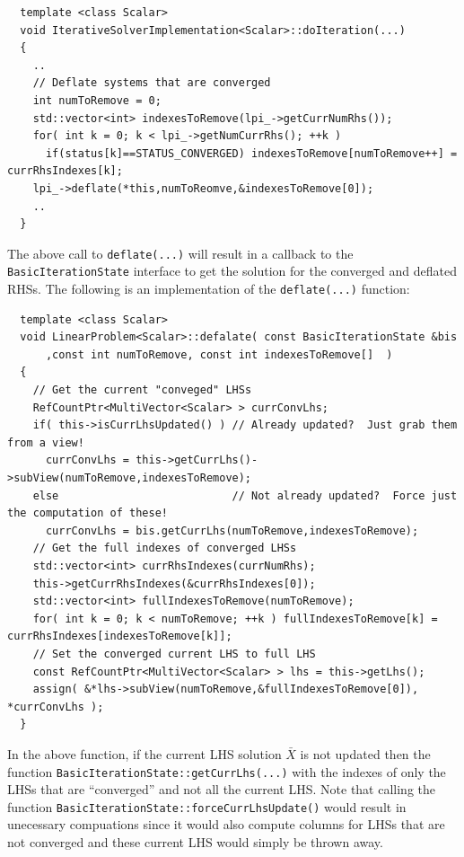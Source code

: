 \documentclass[pdf,ps2pdf,11pt]{SANDreport}
\begin{document}
\begin{enumerate}
{\scriptsize\begin{verbatim}
  template <class Scalar>
  void IterativeSolverImplementation<Scalar>::doIteration(...)
  {
    ..
    // Deflate systems that are converged
    int numToRemove = 0;
    std::vector<int> indexesToRemove(lpi_->getCurrNumRhs());
    for( int k = 0; k < lpi_->getNumCurrRhs(); ++k )
      if(status[k]==STATUS_CONVERGED) indexesToRemove[numToRemove++] = currRhsIndexes[k];
    lpi_->deflate(*this,numToReomve,&indexesToRemove[0]);
    ..
  }
\end{verbatim}}

The above call to {}\texttt{deflate(...)} will result in a callback to
the {}\texttt{Basic\-Iteration\-State} interface to get the solution
for the converged and deflated RHSs.  The following is an
implementation of the {}\texttt{deflate(...)} function:

{\scriptsize\begin{verbatim}
  template <class Scalar>
  void LinearProblem<Scalar>::defalate( const BasicIterationState &bis
      ,const int numToRemove, const int indexesToRemove[]  )
  {
    // Get the current "conveged" LHSs
    RefCountPtr<MultiVector<Scalar> > currConvLhs;
    if( this->isCurrLhsUpdated() ) // Already updated?  Just grab them from a view!
      currConvLhs = this->getCurrLhs()->subView(numToRemove,indexesToRemove);
    else                           // Not already updated?  Force just the computation of these!  
      currConvLhs = bis.getCurrLhs(numToRemove,indexesToRemove);
    // Get the full indexes of converged LHSs
    std::vector<int> currRhsIndexes(currNumRhs);
    this->getCurrRhsIndexes(&currRhsIndexes[0]);
    std::vector<int> fullIndexesToRemove(numToRemove);
    for( int k = 0; k < numToRemove; ++k ) fullIndexesToRemove[k] = currRhsIndexes[indexesToRemove[k]];
    // Set the converged current LHS to full LHS
    const RefCountPtr<MultiVector<Scalar> > lhs = this->getLhs();
    assign( &*lhs->subView(numToRemove,&fullIndexesToRemove[0]), *currConvLhs );
  }
\end{verbatim}}

In the above function, if the current LHS solution $\bar{X}$ is not
updated then the function
{}\texttt{Basic\-Iteration\-State\-::get\-Curr\-Lhs(...)} with the
indexes of only the LHSs that are ``converged'' and not all the
current LHS.  Note that calling the function
{}\texttt{Basic\-Iteration\-State\-::force\-Curr\-Lhs\-Update()} would
result in unecessary compuations since it would also compute columns
for LHSs that are not converged and these current LHS would simply be
thrown away.


\end{enumerate}
\end{document}
